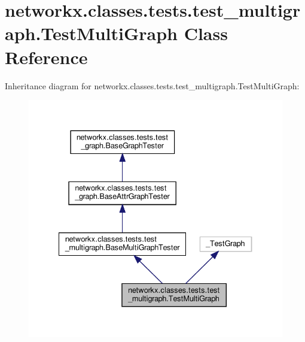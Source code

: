 \hypertarget{classnetworkx_1_1classes_1_1tests_1_1test__multigraph_1_1TestMultiGraph}{}\section{networkx.\+classes.\+tests.\+test\+\_\+multigraph.\+Test\+Multi\+Graph Class Reference}
\label{classnetworkx_1_1classes_1_1tests_1_1test__multigraph_1_1TestMultiGraph}


Inheritance diagram for networkx.\+classes.\+tests.\+test\+\_\+multigraph.\+Test\+Multi\+Graph\+:
\nopagebreak
\begin{figure}[H]
\begin{center}
\leavevmode
\includegraphics[width=334pt]{classnetworkx_1_1classes_1_1tests_1_1test__multigraph_1_1TestMultiGraph__inherit__graph}
\end{center}
\end{figure}


